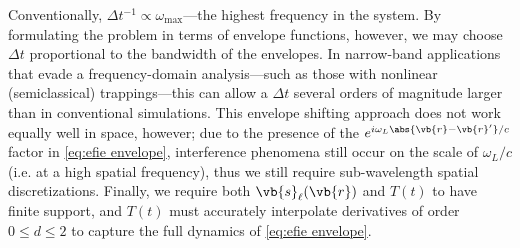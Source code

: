 \hrulefill

Conventionally, $\Delta t^{-1} \propto \omega_\text{max}$---the highest frequency in the system.
By formulating the problem in terms of envelope functions, however, we may choose $\Delta t$ proportional to the bandwidth of the envelopes.
In narrow-band applications that evade a frequency-domain analysis---such as those with nonlinear (semiclassical) trappings---this can allow a $\Delta t$ several orders of magnitude larger than in conventional simulations.
This envelope shifting approach does not work equally well in space, however; due to the presence of the $e^{i \omega_L \abs{\vb{r} - \vb{r}'}/c}$ factor in \cref{eq:efie envelope}, interference phenomena still occur on the scale of $\omega_L/c$ (i.e. at a high spatial frequency), thus we still require sub-wavelength spatial discretizations.
Finally, we require both $\vb{s}_\ell(\vb{r})$ and $T(t)$ to have finite support, and $T(t)$ must accurately interpolate derivatives of order $0 \leqslant d \leqslant 2$ to capture the full dynamics of \cref{eq:efie envelope}.


